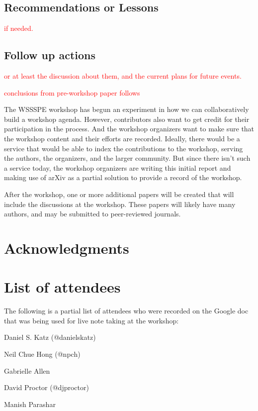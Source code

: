 \documentclass[11pt, oneside]{amsart}
\newcommand{\note}[1]{ {\textcolor{red}    { #1 }}}
\begin{document}
\subsection{Recommendations or Lessons}

\note{if needed.}

\subsection{Follow up actions}

\note{or at least the discussion about them, and the current plans for future events.}

\note{conclusions from pre-workshop paper follows}

The WSSSPE workshop has begun an experiment in how we can collaboratively build a workshop 
agenda. However, contributors also want to get credit for their participation in the process. And the 
workshop organizers want to make sure that the workshop content and their efforts are recorded. 
Ideally, there would be a service that would be able to index the contributions to the workshop, 
serving the authors, the organizers, and the larger community. But since there isn't such a service 
today, the workshop organizers are writing this initial report and making use of arXiv as a partial 
solution to provide a record of the workshop.

After the workshop, one or more additional papers will be created that will include the discussions at 
the workshop. These papers will likely have many authors, and may be submitted to peer-reviewed 
journals.


\section*{Acknowledgments}

\appendix
\section{List of attendees}

The following is a partial list of attendees who were recorded on the Google doc that was being used for live note taking at the workshop:

Daniel S. Katz (@danielskatz)

Neil Chue Hong (@npch)

Gabrielle Allen

David Proctor (@djproctor)

Manish Parashar
\end{document}
